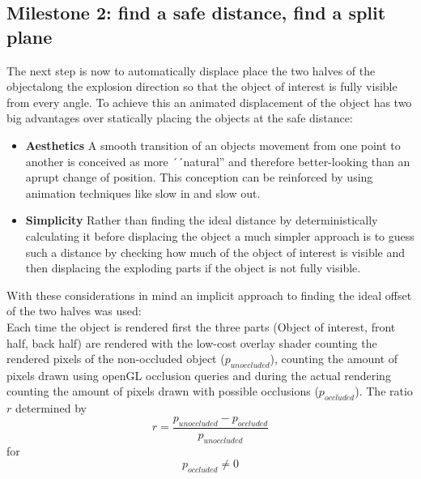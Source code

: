 \subsection{Milestone 2: find a safe distance, find a split plane} 
The next step is now to automatically displace place the two halves of the objectalong the explosion direction so that the object of interest is fully visible from every angle. To achieve this an animated displacement of the object has two big advantages over statically placing the objects at the safe distance:\\
\begin{itemize}
\item \textbf{Aesthetics} A smooth transition of an objects movement from one point to another is conceived as more ´´natural'' and therefore better-looking than an aprupt change of position. This conception can be reinforced by using animation techniques like slow in and slow out.\cite{misc:siggraph}
\item \textbf{Simplicity} Rather than finding the ideal distance by deterministically calculating it before displacing the object a much simpler approach is to guess such a distance by checking how much of the object of interest is visible and then displacing the exploding parts if the object is not fully visible.
\end{itemize}
With these considerations in mind an implicit approach to finding the ideal offset of the two halves was used:\\
Each time the object is rendered first the three parts (Object of interest, front half, back half) are rendered with the low-cost overlay shader counting the rendered pixels of the non-occluded object ($p_{unoccluded}$), counting the amount of pixels drawn using openGL occlusion queries and during the actual rendering counting the amount of pixels drawn with possible occlusions ($p_{occluded}$). The ratio $r$ determined by
\begin{equation}
	\label{eq:OcclusionRatio}
	r =\frac{p_{unoccluded} - p_{occluded}}{ p_{unoccluded}}
\end{equation}
for
\begin{equation}
	p_{occluded} \neq 0
\end{equation}

